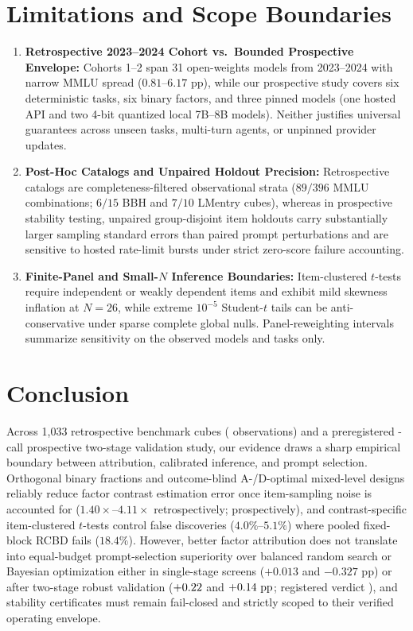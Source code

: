 \documentclass[11pt,a4paper]{article}
\begin{document}
\section{Limitations and Scope Boundaries}
\begin{enumerate}[leftmargin=*,nosep]
    \item \textbf{Retrospective 2023--2024 Cohort vs.\ Bounded Prospective Envelope:} Cohorts 1--2 span 31 open-weights models from 2023--2024 with narrow MMLU spread ($0.81$--$6.17\text{ pp}$), while our prospective study covers six deterministic tasks, six binary factors, and three pinned models (one hosted API and two 4-bit quantized local 7B--8B models). Neither justifies universal guarantees across unseen tasks, multi-turn agents, or unpinned provider updates.
    \item \textbf{Post-Hoc Catalogs and Unpaired Holdout Precision:} Retrospective catalogs are completeness-filtered observational strata ($89/396$ MMLU combinations; $6/15$ BBH and $7/10$ LMentry cubes), whereas in prospective stability testing, unpaired group-disjoint item holdouts carry substantially larger sampling standard errors than paired prompt perturbations and are sensitive to hosted rate-limit bursts under strict zero-score failure accounting.
    \item \textbf{Finite-Panel and Small-$N$ Inference Boundaries:} Item-clustered $t$-tests require independent or weakly dependent items and exhibit mild skewness inflation at $N=26$, while extreme $10^{-5}$ Student-$t$ tails can be anti-conservative under sparse complete global nulls. Panel-reweighting intervals summarize sensitivity on the observed models and tasks only.
\end{enumerate}

\section{Conclusion}
Across 1,033 retrospective benchmark cubes (\TotalStudyObs{} observations) and a preregistered \RealVFourTotalCalls{}-call prospective two-stage validation study, our evidence draws a sharp empirical boundary between attribution, calibrated inference, and prompt selection. Orthogonal binary fractions and outcome-blind A-/D-optimal mixed-level designs reliably reduce factor contrast estimation error once item-sampling noise is accounted for ($1.40\times$--$4.11\times$ retrospectively; \RealVFourEffReductionPct{} prospectively), and contrast-specific item-clustered $t$-tests control false discoveries ($4.0\%$--$5.1\%$) where pooled fixed-block RCBD fails ($18.4\%$). However, better factor attribution does not translate into equal-budget prompt-selection superiority over balanced random search or Bayesian optimization either in single-stage screens ($+0.013$ and $-0.327\text{ pp}$) or after two-stage robust validation ($+0.22{}$ and $+0.14{}\text{ pp}$; registered verdict \RealVFourVerdictCode{}), and stability certificates must remain fail-closed and strictly scoped to their verified operating envelope.
\end{document}
